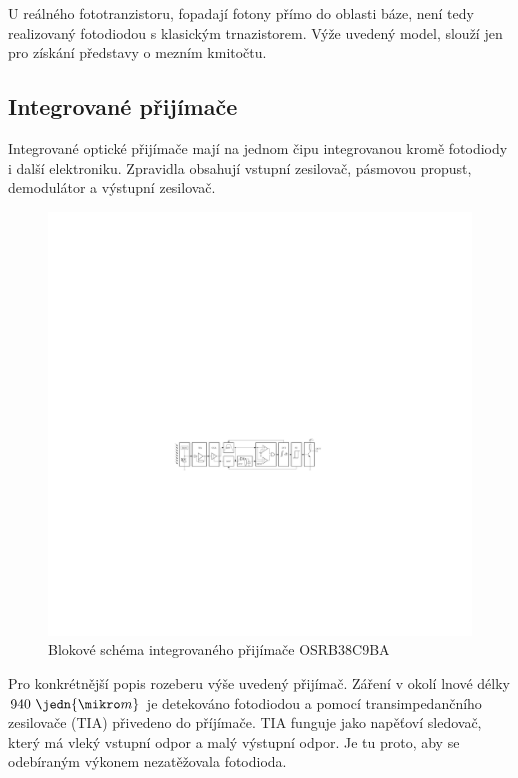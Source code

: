 U reálného fototranzistoru, fopadají fotony přímo do oblasti báze, není tedy realizovaný fotodiodou s klasickým trnazistorem. Výže uvedený model, slouží jen pro získání představy o mezním kmitočtu.

\subsection{Integrované přijímače}
Integrované optické přijímače mají na jednom čipu integrovanou kromě fotodiody i další elektroniku. Zpravidla obsahují vstupní zesilovač, pásmovou propust, demodulátor a výstupní zesilovač.

\begin{figure}[H]
    \begin{center}
        \includegraphics[width=\textwidth]{img/ir-rx}
    \end{center}
    \caption{Blokové schéma integrovaného přijímače OSRB38C9BA}
\end{figure}

Pro konkrétnější popis rozeberu výše uvedený přijímač. Záření v okolí lnové délky $940~\jedn{\mikro m}$ je detekováno fotodiodou a pomocí transimpedančního zesilovače (TIA) přivedeno do příjímače. TIA funguje jako napěťoví sledovač, který má vleký vstupní odpor a malý výstupní odpor. Je tu proto, aby se odebíraným výkonem nezatěžovala fotodioda.

